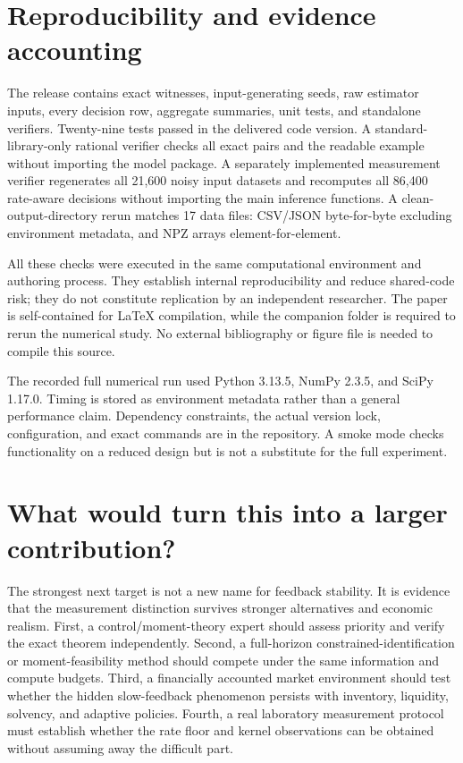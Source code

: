 \documentclass[11pt]{article}
\theoremstyle{remark}\newtheorem{remark}[theorem]{Remark}
\begin{document}
\section{Reproducibility and evidence accounting}\label{sec:repro}
The release contains exact witnesses, input-generating seeds, raw estimator inputs, every decision row, aggregate summaries, unit tests, and standalone verifiers. Twenty-nine tests passed in the delivered code version. A standard-library-only rational verifier checks all exact pairs and the readable example without importing the model package. A separately implemented measurement verifier regenerates all 21,600 noisy input datasets and recomputes all 86,400 rate-aware decisions without importing the main inference functions. A clean-output-directory rerun matches 17 data files: CSV/JSON byte-for-byte excluding environment metadata, and NPZ arrays element-for-element.

All these checks were executed in the same computational environment and authoring process. They establish internal reproducibility and reduce shared-code risk; they do not constitute replication by an independent researcher. The paper is self-contained for LaTeX compilation, while the companion folder is required to rerun the numerical study. No external bibliography or figure file is needed to compile this source.

The recorded full numerical run used Python 3.13.5, NumPy 2.3.5, and SciPy 1.17.0. Timing is stored as environment metadata rather than a general performance claim. Dependency constraints, the actual version lock, configuration, and exact commands are in the repository. A smoke mode checks functionality on a reduced design but is not a substitute for the full experiment.

\section{What would turn this into a larger contribution?}
The strongest next target is not a new name for feedback stability. It is evidence that the measurement distinction survives stronger alternatives and economic realism. First, a control/moment-theory expert should assess priority and verify the exact theorem independently. Second, a full-horizon constrained-identification or moment-feasibility method should compete under the same information and compute budgets. Third, a financially accounted market environment should test whether the hidden slow-feedback phenomenon persists with inventory, liquidity, solvency, and adaptive policies. Fourth, a real laboratory measurement protocol must establish whether the rate floor and kernel observations can be obtained without assuming away the difficult part.
\end{document}
